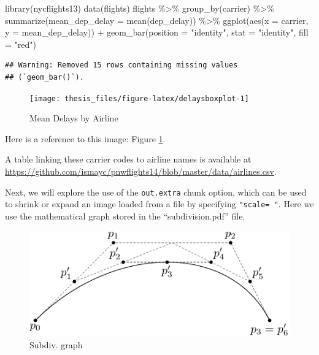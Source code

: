 \documentclass[print]{nuthesis}
\newenvironment{Shaded}{\begin{snugshade}}{\end{snugshade}}
\newcommand{\AttributeTok}[1]{\textcolor[rgb]{0.77,0.63,0.00}{#1}}
\newcommand{\FunctionTok}[1]{\textcolor[rgb]{0.00,0.00,0.00}{#1}}
\newcommand{\NormalTok}[1]{#1}
\newcommand{\SpecialCharTok}[1]{\textcolor[rgb]{0.00,0.00,0.00}{#1}}
\newcommand{\StringTok}[1]{\textcolor[rgb]{0.31,0.60,0.02}{#1}}
\begin{document}
\begin{Shaded}
\begin{Highlighting}[]
\FunctionTok{library}\NormalTok{(nycflights13)}
\FunctionTok{data}\NormalTok{(flights)}
\NormalTok{flights }\SpecialCharTok{\%\textgreater{}\%}
    \FunctionTok{group\_by}\NormalTok{(carrier) }\SpecialCharTok{\%\textgreater{}\%}
    \FunctionTok{summarize}\NormalTok{(}\AttributeTok{mean\_dep\_delay =} \FunctionTok{mean}\NormalTok{(dep\_delay)) }\SpecialCharTok{\%\textgreater{}\%}
    \FunctionTok{ggplot}\NormalTok{(}\FunctionTok{aes}\NormalTok{(}\AttributeTok{x =}\NormalTok{ carrier, }\AttributeTok{y =}\NormalTok{ mean\_dep\_delay)) }\SpecialCharTok{+}
    \FunctionTok{geom\_bar}\NormalTok{(}\AttributeTok{position =} \StringTok{"identity"}\NormalTok{, }\AttributeTok{stat =} \StringTok{"identity"}\NormalTok{,}
        \AttributeTok{fill =} \StringTok{"red"}\NormalTok{)}
\end{Highlighting}
\end{Shaded}

\begin{verbatim}
## Warning: Removed 15 rows containing missing values
## (`geom_bar()`).
\end{verbatim}

\begin{figure}
\texttt{[image: thesis\_files/figure-latex/delaysboxplot-1]} \caption{Mean Delays by Airline}\label{fig:delaysboxplot}
\end{figure}

Here is a reference to this image: Figure \ref{fig:delaysboxplot}.

A table linking these carrier codes to airline names is available at \url{https://github.com/ismayc/pnwflights14/blob/master/data/airlines.csv}.

\clearpage

Next, we will explore the use of the \texttt{out.extra} chunk option, which can be used to shrink or expand an image loaded from a file by specifying \texttt{"scale=\ "}. Here we use the mathematical graph stored in the ``subdivision.pdf'' file.

\begin{figure}
\includegraphics[width=\linewidth,scale=0.75]{figure/subdivision} \caption{Subdiv. graph}\label{fig:subd}
\end{figure}
\end{document}
